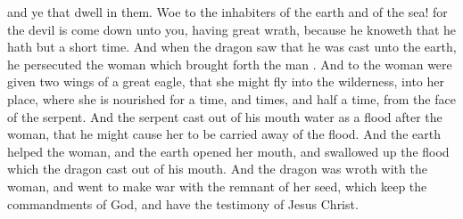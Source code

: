 {and
ye that
dwell
in
them.
Woe to the
inhabiters of the
earth
and of the
sea!
for the
devil is come
down
unto
you,
having
great
wrath,
because he knoweth
that he
hath but a
short
time.
And
when the
dragon
saw
that he was
cast
unto the
earth, he
persecuted the
woman
which brought
forth the
man
{}.
And to the
woman were
given
two
wings of a
great
eagle,
that she might
fly
into the
wilderness,
into
her
place,
where she is
nourished
for a
time,
and
times,
and
half a
time,
from the
face of the
serpent.
And the
serpent cast
out
of
his
mouth
water
as a
flood
after the
woman,
that he might
cause
her to be carried away of the
flood.
And the
earth
helped the
woman,
and the
earth
opened
her
mouth,
and swallowed
up the
flood
which the
dragon cast
out
of
his
mouth.
And the
dragon was
wroth
with the
woman,
and
went to
make
war
with the
remnant of
her
seed,
which
keep the
commandments of
God,
and
have the
testimony of
Jesus
Christ.

}
